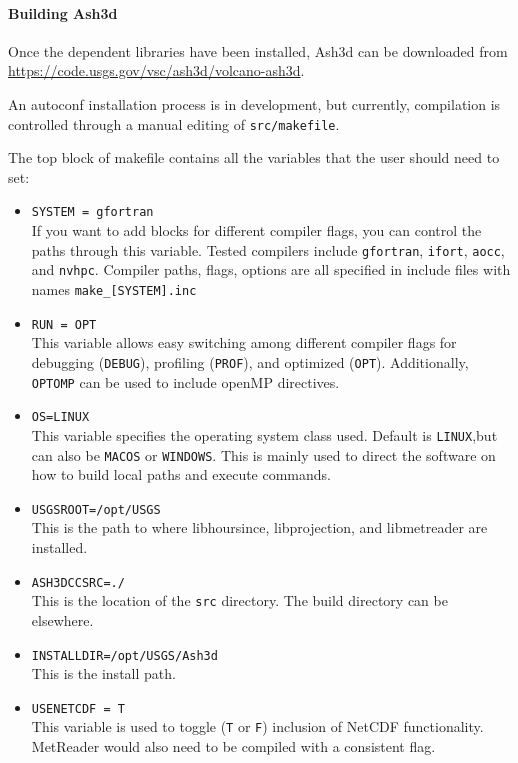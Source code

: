 \paragraph{Building Ash3d}
Once the dependent libraries have been installed, Ash3d can be downloaded from
\url{https://code.usgs.gov/vsc/ash3d/volcano-ash3d}.

An autoconf installation process is in development, but currently,
compilation is controlled through a manual editing of 
\texttt{src/makefile}.

The top block of makefile contains all the variables that the user should
need to set:
\begin{itemize}
 \item \texttt{SYSTEM = gfortran}\\
If you want to add blocks for different compiler flags, you can control
the paths through this variable. Tested compilers include \texttt{gfortran},
\texttt{ifort}, \texttt{aocc}, and \texttt{nvhpc}. Compiler paths, flags, options are all
specified in include files with names \texttt{make\_[SYSTEM].inc}
 \item \texttt{RUN = OPT}\\
This variable allows easy switching among different compiler flags for debugging
(\texttt{DEBUG}),
profiling (\texttt{PROF}), and optimized (\texttt{OPT}). Additionally, \texttt{OPTOMP}
can be used to include openMP directives.
 \item \texttt{OS=LINUX}\\
This variable specifies the operating system class used. Default is \texttt{LINUX},but
can also be \texttt{MACOS} or \texttt{WINDOWS}. This is mainly used to direct the
software on how to build local paths and execute commands.
 \item \texttt{USGSROOT=/opt/USGS}\\
This is the path to where libhoursince, libprojection, and libmetreader are installed.
 \item \texttt{ASH3DCCSRC=./}\\
This is the location of the \texttt{src} directory. The build directory can be
elsewhere.
 \item \texttt{INSTALLDIR=/opt/USGS/Ash3d}\\
This is the install path.
 \item \texttt{USENETCDF = T}\\
This variable is used to toggle (\texttt{T} or \texttt{F}) inclusion of NetCDF
functionality. MetReader would also need to be compiled with a consistent flag.

\end{itemize}
